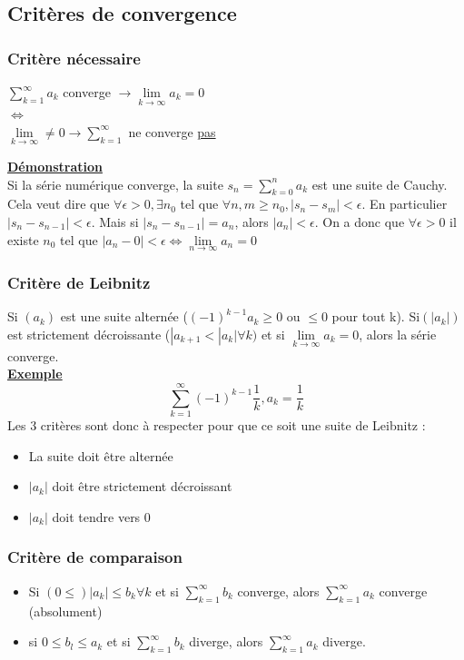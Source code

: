 \documentclass[12pt,a4paper]{article}
\newcommand{\somme}[2]{\ensuremath{\sum\limits_{#2}^{#1}}}
\newcommand{\limite}{\lim\limits_}
\newcommand{\evid}[1]{\textbf{\underline{#1}}}
\newcommand{\ninf}{\ensuremath{n \to \infty}}
\begin{document}
{\subsection{Critères de convergence}
\subsubsection{Critère nécessaire}
\begin{boite}[0.6]
\begin{center}
$\somme{\infty}{k=1}a_k$ converge $ \to \limite{k\to \infty}a_k = 0$\\
$\Leftrightarrow$\\
$\limite{k\to\infty}\neq 0 \to \somme{\infty}{k=1}$ ne converge \underline{pas}
\end{center}
\end{boite}
\evid{Démonstration}\\
Si la série numérique converge, la suite $s_n = \somme{n}{k=0}a_k$ est une suite de Cauchy. Cela veut dire que $\forall \epsilon > 0, \exists n_0$ tel que $\forall n,m\geq n_0, |s_n-s_m|<\epsilon$. En particulier $|s_n - s_{n-1}| < \epsilon$. Mais si $|s_n - s_{n-1}| = a_n$, alors $|a_n| < \epsilon.$ On a donc que $\forall \epsilon > 0$ il existe $n_0$ tel que $|a_n - 0| < \epsilon \Leftrightarrow \limite{\ninf}a_n = 0$
\subsubsection{Critère de Leibnitz}
Si $(a_k)$ est une suite alternée ($(-1)^{k-1}a_k\geq 0$ ou $\leq 0$ pour tout k). Si$(|a_k|)$ est strictement décroissante ($|a_{k+1} < |a_k| \forall k)$ et si $\limite{k\to\infty}a_k =0$, alors la série converge.\\
\evid{Exemple}
\begin{equation}
\somme{\infty}{k=1}(-1)^{k-1}\frac{1}{k}, a_k = \frac{1}{k}
\end{equation}
Les 3 critères sont donc à respecter pour que ce soit une suite de Leibnitz :
\begin{itemize}
	\item La suite doit être alternée
	\item $|a_k|$ doit être strictement décroissant
	\item $|a_k|$ doit tendre vers 0
\end{itemize}

\subsubsection{Critère de comparaison}
\begin{boite}
\begin{itemize}
	\item Si $(0 \leq) |a_k| \leq b_k \forall k$ et si $\somme{\infty}{k=1}b_k$  converge, alors $\somme{\infty}{k=1}a_k$ converge (absolument)
	\item si $0 \leq b_l \leq a_k$ et si $\somme{\infty}{k=1}b_k$ diverge, alors $\somme{\infty}{k=1}a_k$ diverge.
\end{itemize}
\end{boite}
}
\end{document}
